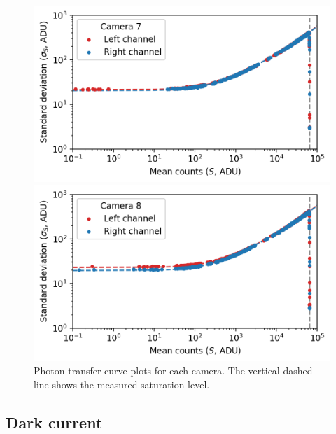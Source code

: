 \begin{colsection}
\begin{colsection}
\begin{figure}[p]
\begin{center}
        \begin{minipage}[t]{0.49\textwidth}\vspace{10pt}
            \includegraphics[width=\linewidth]{images/detectors/ptc_7.png}
        \end{minipage}
        \begin{minipage}[t]{0.49\textwidth}\vspace{10pt}
            \includegraphics[width=\linewidth]{images/detectors/ptc_8.png}
        \end{minipage}
    \end{center}
    \caption[Photon transfer curve plots]{
        Photon transfer curve plots for each camera. The vertical dashed line shows the measured saturation level.
    }\label{fig:ptcs}
\end{figure}

\clearpage

\end{colsection}

\newpage
\subsection{Dark current}
\label{sec:dc}
\begin{colsection}


\end{colsection}
\end{colsection}
